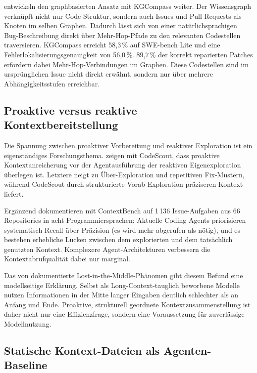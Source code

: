 \textcite{yang2025kgcompass} entwickeln den graphbasierten Ansatz mit KGCompass weiter. Der Wissensgraph verknüpft nicht nur Code-Struktur,
sondern auch Issues und Pull Requests als Knoten im selben Graphen.
Dadurch lässt sich von einer natürlichsprachigen Bug-Beschreibung
direkt über Mehr-Hop-Pfade zu den relevanten Codestellen traversieren.
KGCompass erreicht 58,3\,\% auf SWE-bench Lite
und eine Fehlerlokalisierungsgenauigkeit von 56,0\,\%.
89,7\,\% der korrekt reparierten Patches erfordern dabei
Mehr-Hop-Verbindungen im Graphen.
Diese Codestellen sind im ursprünglichen Issue nicht direkt erwähnt,
sondern nur über mehrere Abhängigkeitsstufen erreichbar.

\subsection*{Proaktive versus reaktive Kontextbereitstellung}

Die Spannung zwischen proaktiver Vorbereitung und reaktiver Exploration
ist ein eigenständiges Forschungsthema.
\textcite{suri2026codescout} zeigen mit CodeScout,
dass proaktive Kontextanreicherung vor der Agentausführung
der reaktiven Eigenexploration überlegen ist.
Letztere neigt zu Über-Exploration und repetitiven Fix-Mustern,
während CodeScout durch strukturierte Vorab-Exploration präziseren Kontext liefert.

Ergänzend dokumentieren \textcite{li2026contextbench} mit ContextBench
auf 1\,136 Issue-Aufgaben aus 66 Repositories in acht Programmiersprachen:
Aktuelle Coding Agents priorisieren systematisch Recall über Präzision
(es wird mehr abgerufen als nötig),
und es bestehen erhebliche Lücken zwischen dem explorierten
und dem tatsächlich genutzten Kontext.
Komplexere Agent-Architekturen verbessern die Kontextabrufqualität dabei nur marginal.

Das von \textcite{liu2023lostmiddle} dokumentierte Lost-in-the-Middle-Phänomen
gibt diesem Befund eine modellseitige Erklärung.
Selbst als Long-Context-tauglich beworbene Modelle nutzen Informationen
in der Mitte langer Eingaben deutlich schlechter als an Anfang und Ende.
Proaktive, strukturell geordnete Kontextzusammenstellung ist daher
nicht nur eine Effizienzfrage, sondern eine Voraussetzung für zuverlässige Modellnutzung.

\subsection*{Statische Kontext-Dateien als Agenten-Baseline}

